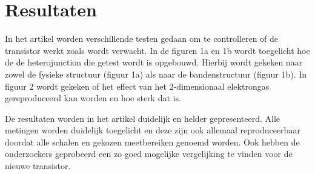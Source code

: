 \documentclass[11pt]{article}
\begin{document}
\newpage

\section{Resultaten}
In het artikel worden verschillende testen gedaan om te controlleren of de transistor werkt zoals wordt verwacht. In de figuren 1a en 1b wordt toegelicht hoe de de heterojunction die getest wordt is opgebouwd. Hierbij wordt gekeken naar zowel de fysieke structuur (figuur 1a) als naar de bandenstructuur (figuur 1b).
In figuur 2 wordt gekeken of het effect van het 2-dimensionaal elektrongas gereproduceerd kan worden en hoe sterk dat is.

De resultaten worden in het artikel duidelijk en helder gepresenteerd. Alle metingen worden duidelijk toegelicht en deze zijn ook allemaal reproduceerbaar doordat alle schalen en gekozen meetbereiken genoemd worden. Ook hebben de onderzoekers geprobeerd een zo goed mogelijke vergelijking te vinden voor de nieuwe transistor.
\end{document}
